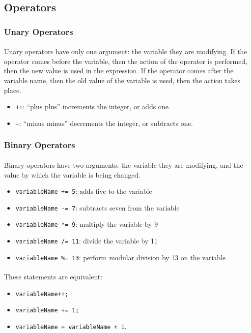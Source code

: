 \documentclass[letter,11pt]{article}
\begin{document}
\subsection{Operators}

\subsubsection{Unary Operators}
\paragraph{}Unary operators have only one argument: the variable they are modifying. If the operator comes before the variable, then the action of the operator is performed, then the new value is used in the expression. If the operator comes after the variable name, then the old value of the variable is used, then the action takes place.

\begin{itemize}
    \item \texttt{++}: ``plus plus'' increments the integer, or adds one.
    \item \texttt{--}: ``minus minus'' decrements the integer, or subtracts one.
\end{itemize}

\subsubsection{Binary Operators}
\paragraph{}Binary operators have two arguments: the variable they are modifying, and the value by which the variable is being changed.

\begin{itemize}
    \item \texttt{variableName += 5}: adds five to the variable
    \item \texttt{variableName -= 7}: subtracts seven from the variable
    \item \texttt{variableName *= 9}: multiply the variable by 9
    \item \texttt{variableName /= 11}: divide the variable by 11
    \item \texttt{variableName \%= 13}: perform modular division by 13 on the variable
\end{itemize}

\paragraph{}These statements are equivalent:
\begin{itemize}
    \item \texttt{variableName++;}
    \item \texttt{variableName += 1;}
    \item \texttt{variableName = variableName + 1}.
\end{itemize}
\end{document}
